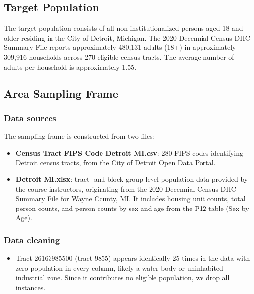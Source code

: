 \documentclass[
  11pt,
]{article}
\providecommand{\tightlist}{%
  \setlength{\itemsep}{0pt}\setlength{\parskip}{0pt}}\usepackage{longtable,booktabs,array}
\begin{document}
\subsection{Target Population}\label{target-population}

The target population consists of all non-institutionalized persons aged
18 and older residing in the City of Detroit, Michigan. The 2020
Decennial Census DHC Summary File reports approximately 480,131 adults
(18+) in approximately 309,916 households across 270 eligible census
tracts. The average number of adults per household is approximately
1.55.

\subsection{Area Sampling Frame}\label{sec-frame}

\subsubsection{Data sources}\label{data-sources}

The sampling frame is constructed from two files:

\begin{itemize}
\tightlist
\item
  \textbf{Census Tract FIPS Code Detroit MI.csv}: 280 FIPS codes
  identifying Detroit census tracts, from the City of Detroit Open Data
  Portal.
\item
  \textbf{Detroit MI.xlsx}: tract- and block-group-level population data
  provided by the course instructors, originating from the 2020
  Decennial Census DHC Summary File for Wayne County, MI. It includes
  housing unit counts, total person counts, and person counts by sex and
  age from the P12 table (Sex by Age).
\end{itemize}

\subsubsection{Data cleaning}\label{data-cleaning}

\begin{itemize}
\tightlist
\item
  Tract 26163985500 (tract 9855) appears identically 25 times in the
  data with zero population in every column, likely a water body or
  uninhabited industrial zone. Since it contributes no eligible
  population, we drop all instances.
\end{itemize}
\end{document}

